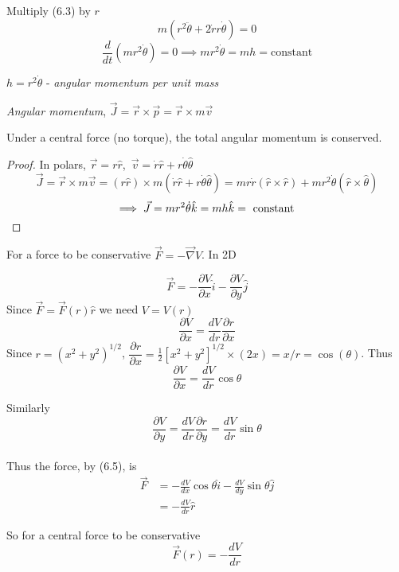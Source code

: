 Multiply (6.3) by $r$
\[m(r^2\ddot{\theta} + 2\dot{r}r\dot{\theta}) = 0\]
\[\frac{d}{dt}(mr^2\dot{\theta}) = 0 \implies mr^2\dot{\theta} = mh = \text{constant}\]
\begin{definition}
$h = r^2\dot{\theta}$ - \emph{angular momentum per unit mass}

\emph{Angular momentum}, $\vec{J} = \vec{r} \times \vec{p} = \vec{r} \times m \vec{v}$
\end{definition}
\begin{theorem}
	Under a central force (no torque), the total angular momentum is conserved.
\end{theorem}

\begin{proof}
In polars, $\vec{r} = r\hat{r}$,~$\vec{v} = \dot{r}\hat{r} + r\dot{\theta}\hat{\theta}$
\[\vec{J} = \vec{r} \times m\vec{v} = (r\hat{r}) \times m(\dot{r}\hat{r} + r\dot{\theta}\hat{\theta}) = mr\dot{r}(\hat{r}\times\hat{r}) + mr^2\dot{\theta}(\hat{r} \times \hat{\theta}) \]
\[\implies \vec{J} =  mr^2\dot{\theta}\hat{k} = mh\hat{k} = \text{ constant }\qedhere\]
\end{proof}



For a force to be conservative $\vec{F} = -\vec{\nabla}V$. In 2D

\begin{equation}\vec{F} = -\frac{\partial V}{\partial x}\hat{i} - \frac{\partial V}{\partial y}\hat{j}\end{equation}
Since $\vec{F} = \vec{F}(r)\hat{r}$ we need $V = V(r)$
\[\frac{\partial V}{\partial x} = \frac{dV}{dr}\frac{\partial r}{\partial x}\]
Since $r = (x^2 + y^2)^{1/2}$, $\dfrac{\partial r}{\partial x} = \frac{1}{2}[x^2 + y^2]^{1/2}\times(2x) = x/r = \cos(\theta)$.
Thus 
\[\frac{\partial V}{\partial x} = \frac{dV}{dr}\cos\theta\]

Similarly \[\frac{\partial V}{\partial y} = \frac{dV}{dr}\frac{\partial r}{\partial y} = \frac{dV}{dr}\sin\theta\]~\\

Thus the force, by (6.5), is
\[\begin{aligned}\vec{F} &= -\frac{dV}{dx}\cos\theta\hat{i} - \frac{dV}{dy}\sin\theta\hat{j}\\
 &= -\frac{dV}{dr}\hat{r}
\end{aligned}
\]

So for a central force to be conservative
\[\vec{F}(r) = -\frac{dV}{dr}\]

